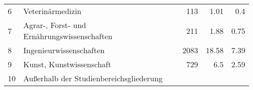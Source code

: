 \begin{longtable}{lXrrr}
     6 &
     \multicolumn{1}{X}{ Veterinärmedizin   } &


       \num{113} &
       \num[round-mode=places,round-precision=2]{1,01} &
         \num[round-mode=places,round-precision=2]{0,4} \\

     7 &
     \multicolumn{1}{X}{ Agrar-, Forst- und Ernährungswissenschaften   } &


       \num{211} &
       \num[round-mode=places,round-precision=2]{1,88} &
         \num[round-mode=places,round-precision=2]{0,75} \\

     8 &
     \multicolumn{1}{X}{ Ingenieurwissenschaften   } &


       \num{2083} &
       \num[round-mode=places,round-precision=2]{18,58} &
         \num[round-mode=places,round-precision=2]{7,39} \\

     9 &
     \multicolumn{1}{X}{ Kunst, Kunstwissenschaft   } &


       \num{729} &
       \num[round-mode=places,round-precision=2]{6,5} &
         \num[round-mode=places,round-precision=2]{2,59} \\

     10 &
     \multicolumn{1}{X}{ Außerhalb der Studienbereichsgliederung   } &



\end{longtable}
